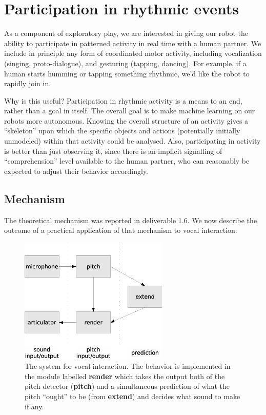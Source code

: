 
\section{Participation in rhythmic events}

As a component of exploratory play, we are interested in giving our
robot the ability to participate in patterned activity in real time
with a human partner.  We include in principle any form of
coordinated motor activity, including vocalization
(singing, proto-dialogue), and gesturing (tapping, dancing).
%
For example, if a human starts humming or tapping something rhythmic, 
we'd like the robot to rapidly join in.

Why is this useful?  Participation in rhythmic activity is a means to
an end, rather than a goal in itself.  The overall goal is to make
machine learning on our robots more autonomous.
%
Knowing the overall structure of an activity gives a ``skeleton'' upon
which the specific objects and actions (potentially initially
unmodeled) within that activity could be analysed.
%
Also, participating in activity is better than just observing it,
since there is an implicit signalling of ``comprehension'' level
available to the human partner, who can reasonably be expected to
adjust their behavior accordingly.


\subsection{Mechanism}

The theoretical mechanism was reported in deliverable 1.6.
We now describe the outcome of a practical application
of that mechanism to vocal interaction.


\begin{figure}[hbt]
\centerline{\includegraphics[height=6cm]{images/sing-modules}}
\caption {
%
The system for vocal interaction.
The behavior is implemented in the module labelled {\bf render} which
takes the output both of the pitch detector ({\bf pitch}) and a simultaneous 
prediction of what the pitch ``ought'' to be (from {\bf extend})
and decides what sound to make if any.
%
}
\end{figure}



